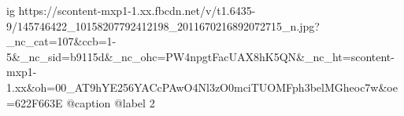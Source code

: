  
 
 
 
 

\ifcmt
  ig https://scontent-mxp1-1.xx.fbcdn.net/v/t1.6435-9/145746422_10158207792412198_2011670216892072715_n.jpg?_nc_cat=107&ccb=1-5&_nc_sid=b9115d&_nc_ohc=PW4npgtFacUAX8hK5QN&_nc_ht=scontent-mxp1-1.xx&oh=00_AT9hYE256YACcPAwO4Nl3zO0mciTUOMFph3belMGheoc7w&oe=622F663E
  @caption @label 2
\fi
